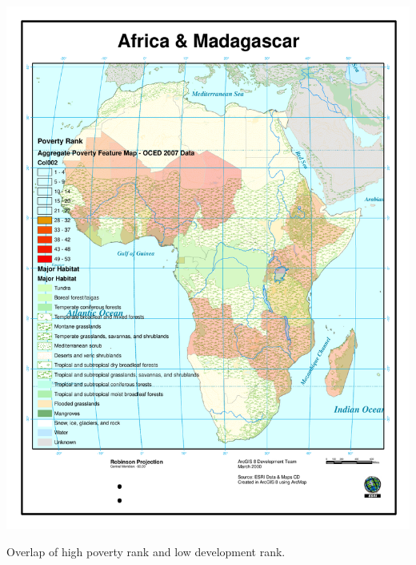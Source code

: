 \includegraphics[width=6in]{Images/GIS/PovertyFeatureMapV3_Poverty_Habitat.pdf}

\newpage

Overlap of high poverty rank and low development rank.


